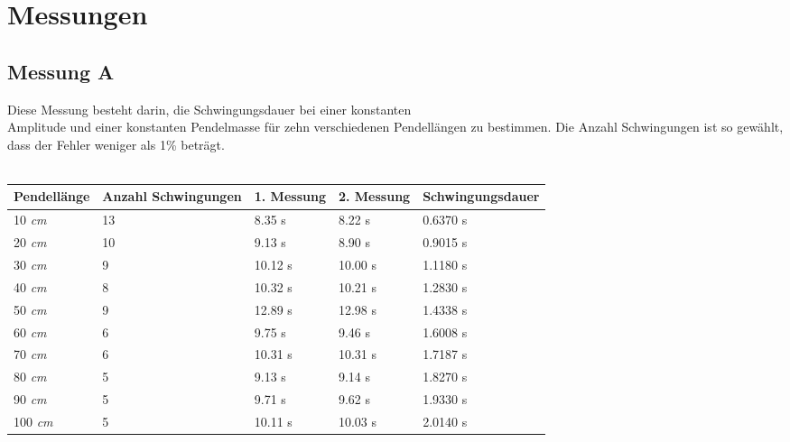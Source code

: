 \documentclass{report}
\begin{document}
    \chapter*{Messungen}
    \section*{Messung A}
    Diese Messung besteht darin, die Schwingungsdauer bei einer konstanten \\ Amplitude und einer konstanten Pendelmasse für zehn verschiedenen Pendellängen zu bestimmen. Die Anzahl Schwingungen ist so gewählt, dass der Fehler weniger als 1\% beträgt. \\
    \\
    \begin{center}
        \begin{tabular}{ | m{5em} | m{4cm}| m{2cm} | m{2cm} | m{3cm} | }
            \hline
            Pendellänge & Anzahl Schwingungen &1. Messung & 2. Messung & Schwingungsdauer\\ 
            \hline
            10 \textit{cm} & 13 & 8.35 s & 8.22 s & 0.6370 s\\ 
            \hline
            20 \textit{cm} & 10 & 9.13 s & 8.90 s & 0.9015 s \\ 
            \hline
            30 \textit{cm} & 9 & 10.12 s & 10.00 s & 1.1180 s \\ 
            \hline
            40 \textit{cm} & 8 & 10.32 s & 10.21 s & 1.2830 s \\ 
            \hline
            50 \textit{cm} & 9 & 12.89 s & 12.98 s & 1.4338 s \\ 
            \hline
            60 \textit{cm} & 6 & 9.75 s & 9.46 s & 1.6008 s \\ 
            \hline
            70 \textit{cm} & 6 & 10.31 s & 10.31 s & 1.7187 s \\ 
            \hline
            80 \textit{cm} & 5 & 9.13 s & 9.14 s & 1.8270 s \\ 
            \hline
            90 \textit{cm} & 5 & 9.71 s & 9.62 s & 1.9330 s \\ 
            \hline
            100 \textit{cm} & 5 & 10.11 s & 10.03 s & 2.0140 s \\ 
            \hline

          \end{tabular}
    \end{center}
\end{document}
